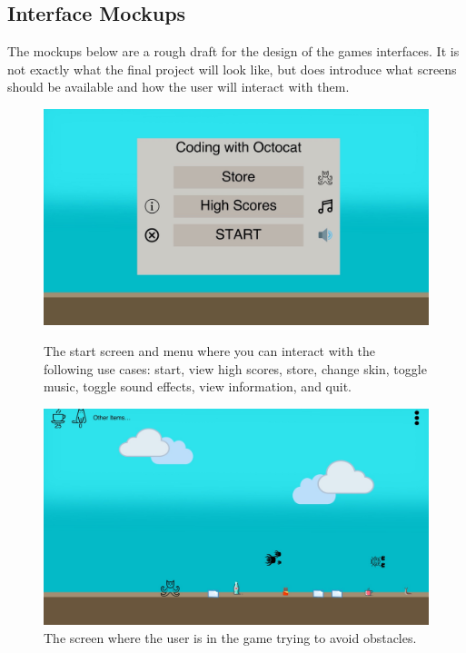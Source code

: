 \documentclass[10pt,conference,onecolumn,compsoc]{IEEEtran}
\begin{document}
\clearpage

\subsection{Interface Mockups}
The mockups below are a rough draft for the design of the games interfaces. It is not exactly what the final project will look like, but does introduce what screens should be available and how the user will interact with them.


\begin{figure}[!ht]
\centering
\includegraphics[scale=.2]{MockupStartScreen.jpeg}
\caption{The start screen and menu where you can interact with the following use cases: start, view high scores, store, change skin, toggle music, toggle sound effects, view information, and quit.}

\includegraphics[scale=.2]{MockupIngame.jpeg}
\caption{The screen where the user is in the game trying to avoid obstacles. }
\end{figure}
\end{document}
